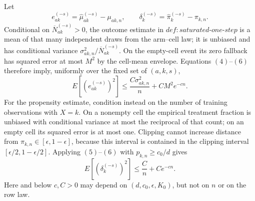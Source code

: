 Let
\[
 e_{ak}^{(-s)}=\widehat\mu_{ak}^{(-s)}-\mu_{ak,n},\qquad
 \delta_k^{(-s)}=\widehat\pi_k^{(-s)}-\pi_{k,n}.
\]
Conditional on \(\overline N_{ak}^{(-s)}>0\), the outcome estimate in
\(def:saturated\text{-}one\text{-}step\) is a mean of that many independent
draws from the arm--cell law; it is unbiased and has conditional variance
\(\sigma_{ak,n}^2/\overline N_{ak}^{(-s)}\).  On the empty-cell event its
zero fallback has squared error at most \(M^2\) by the cell-mean envelope.
Equations \((4)\)--\((6)\) therefore imply, uniformly over the fixed set of
\((a,k,s)\),
\[
 E[(e_{ak}^{(-s)})^2]
 \le \frac{C\sigma_{ak,n}^2}{n}+CM^2e^{-cn}.                        \tag{7}
\]
For the propensity estimate, condition instead on the number of training
observations with \(X=k\).  On a nonempty cell the empirical treatment
fraction is unbiased with conditional variance at most the reciprocal of
that count; on an empty cell its squared error is at most one.  Clipping
cannot increase distance from
\(\pi_{k,n}\in[\epsilon,1-\epsilon]\), because this interval is contained
in the clipping interval \([\epsilon/2,1-\epsilon/2]\).  Applying
\((5)\)--\((6)\) with \(p_{k,n}\ge c_0/d\) gives
\[
 E[(\delta_k^{(-s)})^2]\le \frac Cn+Ce^{-cn}.                       \tag{8}
\]
Here and below \(c,C>0\) may depend on
\((d,c_0,\epsilon,K_0)\), but not on \(n\) or on the row law.

